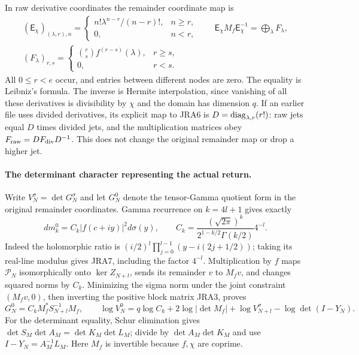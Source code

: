 In raw derivative coordinates the remainder coordinate map is
\begin{equation}
\begin{gathered}
 (\mathsf E_\chi)_{(\lambda,r),n}
 =\begin{cases}n!\lambda^{n-r}/(n-r)!,&n\geq r,\\0,&n<r,\end{cases}
 \qquad
 \mathsf E_\chi M_f\mathsf E_\chi^{-1}
 =\bigoplus_\lambda F_\lambda,\\
 (F_\lambda)_{r,s}=
 \begin{cases}\binom rs f^{(r-s)}(\lambda),&r\geq s,\\0,&r<s.\end{cases}
\end{gathered}
 \tag{JRA6}
\end{equation}
All $0\leq r<e$ occur, and entries between different nodes are zero.
The equality is Leibniz's formula.
The inverse is Hermite interpolation, since vanishing of all these
derivatives is divisibility by $\chi$ and the domain has dimension $q$.
If an earlier file uses divided derivatives, its explicit map to JRA6 is
$D=\operatorname{diag}_{\lambda,r}(r!)$: raw jets equal $D$ times divided jets, and
the multiplication matrices obey $F_{\rm raw}=D F_{\rm div}D^{-1}$.
This does not change the original remainder map or drop a higher jet.

\paragraph{The determinant character representing the actual return.}
Write $V_N^\sigma=\det G_N^\sigma$ and let $G_N^0$ denote the tensor-Gamma
quotient form in the original remainder coordinates. Gamma recurrence on
$k=4l+1$ gives exactly
\begin{equation}
 dm_k^0=C_k|f(c+iy)|^2d\sigma(y),\qquad
 C_k=\frac{(\sqrt{2\pi})^k}{2^{1-k/2}\Gamma(k/2)}4^{-l}.
 \tag{JRA7}
\end{equation}
Indeed the holomorphic ratio is $(i/2)^l\prod_{j=0}^{l-1}(y-i(2j+1/2))$;
taking its real-line modulus gives JRA7, including the factor $4^{-l}$.
Multiplication by $f$ maps $\mathcal P_N$ isomorphically onto
$\ker Z_{N+l}$, sends its remainder $v$ to $M_fv$, and changes squared
norms by $C_k$. Minimizing the sigma norm under the joint constraint
$(M_fv,0)$, then inverting the positive block matrix JRA3, proves
\begin{equation}
 G_N^0=C_kM_f^*S_{N+l}^{-1}M_f,\qquad
 \log V_N^0=q\log C_k+2\log|\det M_f|
            +\log V_{N+l}^\sigma-\log\det(I-Y_N).
 \tag{JRA8}
\end{equation}
For the determinant equality, Schur elimination gives
$\det S_M\det A_M=\det K_M\det L_M$; divide by
$\det A_M\det K_M$ and use $I-Y_N=A_M^{-1}L_M$.
Here $M_f$ is invertible because $f,\chi$ are coprime.

